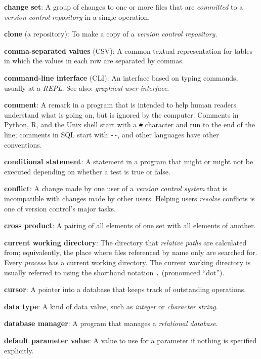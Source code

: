 \documentclass[]{book}
\newcommand{\gdef}[2]{\emph{#2}}
\begin{document}
\textbf{change set}: A group of changes to one or more files that are
\gdef{g:commit}{committed} to a \gdef{g:version-control}{version
control} \gdef{g:repository}{repository} in a single operation.

\textbf{clone} (a repository): To make a copy of a
\gdef{g:repository}{version control repository}.

\textbf{comma-separated values} (CSV): A common textual representation
for tables in which the values in each row are separated by commas.

\textbf{command-line interface} (CLI): An interface based on typing
commands, usually at a \gdef{g:repl}{REPL}. See also:
\gdef{g:gui}{graphical user interface}.

\textbf{comment}: A remark in a program that is intended to help human
readers understand what is going on, but is ignored by the computer.
Comments in Python, R, and the Unix shell start with a \texttt{\#}
character and run to the end of the line; comments in SQL start with
\texttt{-{}-}, and other languages have other conventions.

\textbf{conditional statement}: A statement in a program that might or
might not be executed depending on whether a test is true or false.

\textbf{conflict}: A change made by one user of a
\gdef{g:version-control}{version control system} that is
incompatible with changes made by other users. Helping users
\gdef{g:resolve}{resolve} conflicts is one of version control's
major tasks.

\textbf{cross product}: A pairing of all elements of one set with all
elements of another.

\textbf{current working directory}: The directory that
\gdef{g:relative-path}{relative paths} are calculated from;
equivalently, the place where files referenced by name only are searched
for. Every \gdef{g:process}{process} has a current working
directory. The current working directory is usually referred to using
the shorthand notation \texttt{.} (pronounced ``dot'').

\textbf{cursor}: A pointer into a database that keeps track of
outstanding operations.

\textbf{data type}: A kind of data value, such as
\gdef{g:integer}{integer} or \gdef{g:string}{character string}.

\textbf{database manager}: A program that manages a
\gdef{g:relational-database}{relational database}.

\textbf{default parameter value}: A value to use for a parameter if
nothing is specified explicitly.
\end{document}
